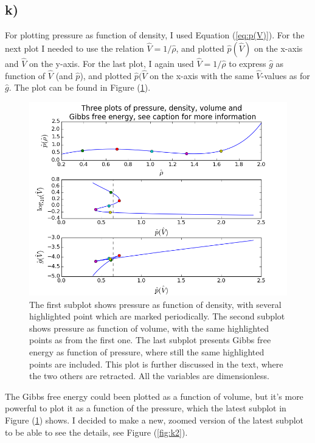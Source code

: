 \documentclass{scrartcl}
\begin{document}
\subsection*{k)}
For plotting pressure as function of density, I used Equation (\ref{eq:p(V)}). For the next plot I needed to use the relation $\hat{V}=1/\hat{\rho}$, and plotted $\hat{p}(\hat{V})$ on the x-axis and $\hat{V}$ on the y-axis. For the last plot, I again used $\hat{V}=1/\hat{\rho}$ to express $\hat{g}$ as function of $\hat{V}$ (and $\hat{p}$), and plotted $\hat{p}(\hat{V}$ on the x-axis with the same $\hat{V}$-values as for $\hat{g}$. The plot can be found in Figure (\ref{fig:k1}).
\begin{figure}[H]
\centering
\includegraphics[width=150mm]{oblig3_3.png}
\caption{The first subplot shows pressure as function of density, with several highlighted point which are marked periodically. The second subplot shows pressure as function of volume, with the same highlighted points as from the first one. The last subplot presents Gibbs free energy as function of pressure, where still the same highlighted points are included. This plot is further discussed in the text, where the two others are retracted. All the variables are dimensionless.}
\label{fig:k1}
\end{figure}
The Gibbs free energy could been plotted as a function of volume, but it's more powerful to plot it as a function of the pressure, which the latest subplot in Figure (\ref{fig:k1}) shows. I decided to make a new, zoomed version of the latest subplot to be able to see the details, see Figure (\ref{fig:k2}).
\end{document}
